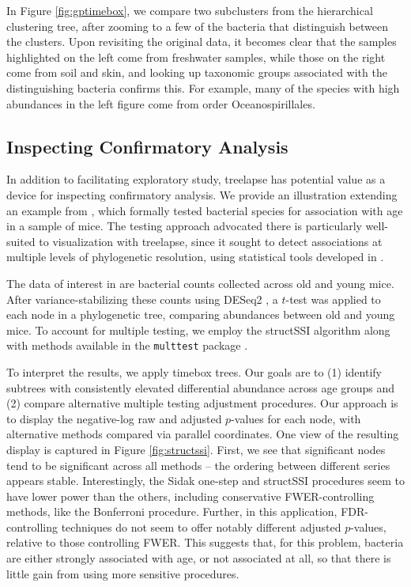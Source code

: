 \documentclass[12pt]{article}
\begin{document}
In Figure \ref{fig:gptimebox}, we compare two subclusters from the
hierarchical clustering tree, after zooming to a few of the bacteria
that distinguish between the clusters. Upon revisiting the original
data, it becomes clear that the samples highlighted on the left come
from freshwater samples, while those on the right come from soil and
skin, and looking up taxonomic groups associated with the distinguishing
bacteria confirms this. For example, many of the species with high
abundances in the left figure come from order Oceanospirillales.

\subsection{Inspecting Confirmatory Analysis}\label{structssi}

In addition to facilitating exploratory study, treelapse has potential
value as a device for inspecting confirmatory analysis. We provide an
illustration extending an example from \citep{callahan2016bioconductor}, which
formally tested bacterial species for association with age in a sample of mice.
The testing approach advocated there is particularly well-suited to
visualization with treelapse, since it sought to detect associations at multiple
levels of phylogenetic resolution, using statistical tools developed in
\citep{yekutieli2008hierarchical, sankaran2014structssi}.

The data of interest in \citep{callahan2016bioconductor} are bacterial counts
collected across old and young mice. After variance-stabilizing these counts
using DESeq2 \citep{love2014moderated}, a $t$-test was applied to each node in a
phylogenetic tree, comparing abundances between old and young mice. To account
for multiple testing, we employ the structSSI algorithm
\citep{yekutieli2008hierarchical, sankaran2014structssi} along with methods
available in the \texttt{multtest} package \citep{pollard2005multiple}.

To interpret the results, we apply timebox trees. Our goals are to (1) identify
subtrees with consistently elevated differential abundance across age groups and
(2) compare alternative multiple testing adjustment procedures. Our approach is
to display the negative-log raw and adjusted $p$-values for each node, with
alternative methods compared via parallel coordinates. One view of the resulting
display is captured in Figure \ref{fig:structssi}. First, we see that
significant nodes tend to be significant across all methods -- the ordering
between different series appears stable. Interestingly, the Sidak one-step and
structSSI procedures seem to have lower power than the others, including
conservative FWER-controlling methods, like the Bonferroni procedure. Further,
in this application, FDR-controlling techniques do not seem to offer notably
different adjusted $p$-values, relative to those controlling FWER. This suggests
that, for this problem, bacteria are either strongly associated with age, or not
associated at all, so that there is little gain from using more sensitive
procedures.
\end{document}
